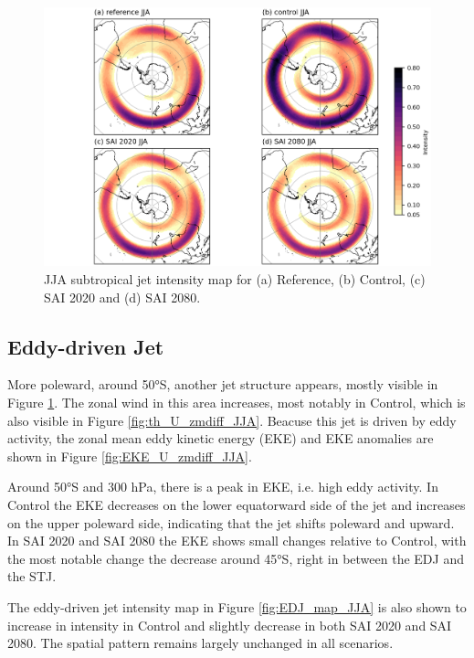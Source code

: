 \begin{figure}[H]
	\centering
	\includegraphics[width=0.95\linewidth]{images/STJ_map_JJA.png}
	\caption{JJA subtropical jet intensity map for (a) Reference, (b) Control, (c) SAI 2020 and (d) SAI 2080.}
	\label{fig:STJ_map_JJA}
\end{figure}


\subsection{Eddy-driven Jet}
More poleward, around 50°S, another jet structure appears, mostly visible in Figure \ref{fig:STJ_map_JJA}. The zonal wind in this area increases, most notably in Control, which is also visible in Figure \ref{fig:th_U_zmdiff_JJA}. Beacuse this jet is driven by eddy activity, the zonal mean eddy kinetic energy (EKE) and EKE anomalies are shown in Figure \ref{fig:EKE_U_zmdiff_JJA}.

Around 50°S and 300 hPa, there is a peak in EKE, i.e. high eddy activity. In Control the EKE decreases on the lower equatorward side of the jet and increases on the upper poleward side, indicating that the jet shifts poleward and upward. In SAI 2020 and SAI 2080 the EKE shows small changes relative to Control, with the most notable change the decrease around 45°S, right in between the EDJ and the STJ. 

The eddy-driven jet intensity map in Figure \ref{fig:EDJ_map_JJA} is also shown to increase in intensity in Control and slightly decrease in both SAI 2020 and SAI 2080. The spatial pattern remains largely unchanged in all scenarios. 

